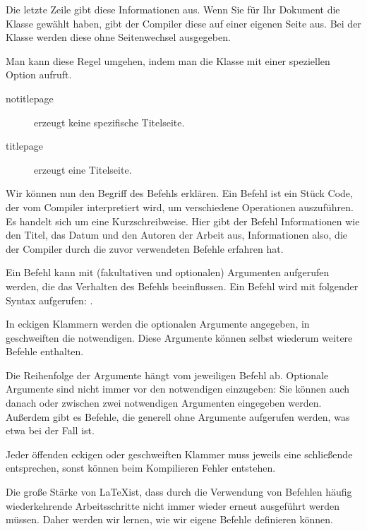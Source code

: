Die letzte Zeile gibt diese Informationen aus. Wenn Sie für Ihr Dokument die Klasse  gewählt haben, gibt der Compiler diese auf einer eigenen Seite aus. Bei der Klasse  werden diese ohne Seitenwechsel ausgegeben.

Man kann diese Regel umgehen, indem man die Klasse mit einer speziellen Option aufruft.
\begin{description}
\item[notitlepage] erzeugt keine spezifische Titelseite.
\item[titlepage] erzeugt eine Titelseite.
\end{description}

Wir können nun den Begriff des Befehls erklären. Ein Befehl ist ein Stück Code, der vom Compiler interpretiert wird, um verschiedene Operationen auszuführen. Es handelt sich um eine Kurzschreibweise. Hier gibt der Befehl  Informationen wie den Titel, das Datum und den Autoren der Arbeit aus, Informationen also, die der Compiler durch die zuvor verwendeten Befehle erfahren hat.

Ein Befehl kann mit (fakultativen und optionalen) Argumenten aufgerufen werden, die das Verhalten des Befehls beeinflussen.
\label{syntaxecommande}Ein Befehl wird mit folgender Syntax aufgerufen: 
.

In eckigen Klammern werden die optionalen Argumente angegeben, in geschweiften die notwendigen. Diese Argumente können selbst wiederum weitere Befehle enthalten.

Die Reihenfolge der Argumente hängt vom jeweiligen Befehl ab. Optionale Argumente sind nicht immer vor den notwendigen einzugeben: Sie können auch danach oder zwischen zwei notwendigen Argumenten eingegeben werden. Außerdem gibt es Befehle, die generell ohne Argumente aufgerufen werden, was etwa bei  der Fall ist.

\begin{attention}
Jeder öffenden eckigen oder geschweiften Klammer muss jeweils eine schließende entsprechen, sonst können beim Kompilieren Fehler entstehen.
\end{attention}

Die große Stärke von \LaTeX ist, dass durch die Verwendung von Befehlen häufig wiederkehrende Arbeitsschritte nicht immer wieder erneut ausgeführt werden müssen. Daher werden wir lernen, wie wir eigene Befehle definieren können.


